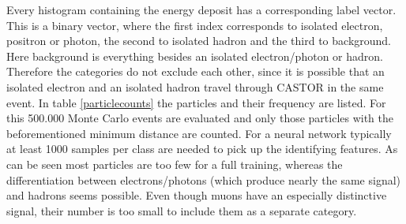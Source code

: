 Every histogram containing the energy deposit has a corresponding label vector. This is a binary vector, where the first index corresponds to isolated electron, positron or photon, the second to isolated hadron and the third to background. Here background is everything besides an isolated electron/photon or hadron. Therefore the categories do not exclude each other, since it is possible that an isolated electron and an isolated hadron travel through CASTOR in the same event. In table \ref{particlecounts} the particles and their frequency are listed. For this 500.000 Monte Carlo events are evaluated and only those particles with the beforementioned minimum distance are counted. For a neural network typically at least 1000 samples per class are needed to pick up the identifying features. As can be seen most particles are too few for a full training, whereas the differentiation between electrons/photons (which produce nearly the same signal) and hadrons seems possible. Even though muons have an especially distinctive signal, their number is too small to include them as a separate category.

